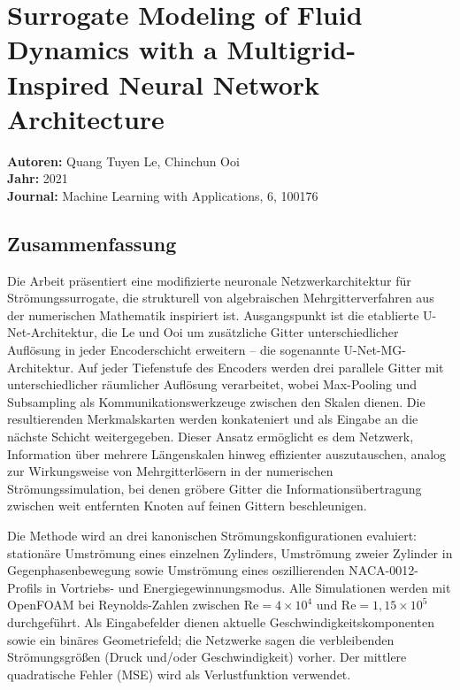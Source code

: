 \documentclass[a4paper,12pt]{article}
\begin{document}
\section*{Surrogate Modeling of Fluid Dynamics with a Multigrid-Inspired Neural
Network Architecture}
\textbf{Autoren:} Quang Tuyen Le, Chinchun Ooi \\
\textbf{Jahr:} 2021 \\
\textbf{Journal:} Machine Learning with Applications, 6, 100176

\subsection*{Zusammenfassung}

Die Arbeit präsentiert eine modifizierte neuronale Netzwerkarchitektur für
Strömungssurrogate, die strukturell von algebraischen Mehrgitterverfahren aus der
numerischen Mathematik inspiriert ist. Ausgangspunkt ist die etablierte U-Net-Architektur,
die Le und Ooi um zusätzliche Gitter unterschiedlicher Auflösung in jeder Encoderschicht
erweitern -- die sogenannte U-Net-MG-Architektur. Auf jeder Tiefenstufe des Encoders
werden drei parallele Gitter mit unterschiedlicher räumlicher Auflösung verarbeitet, wobei
Max-Pooling und Subsampling als Kommunikationswerkzeuge zwischen den Skalen dienen.
Die resultierenden Merkmalskarten werden konkateniert und als Eingabe an die nächste
Schicht weitergegeben. Dieser Ansatz ermöglicht es dem Netzwerk, Information über
mehrere Längenskalen hinweg effizienter auszutauschen, analog zur Wirkungsweise von
Mehrgitterlösern in der numerischen Strömungssimulation, bei denen gröbere Gitter die
Informationsübertragung zwischen weit entfernten Knoten auf feinen Gittern
beschleunigen.

Die Methode wird an drei kanonischen Strömungskonfigurationen evaluiert: stationäre
Umströmung eines einzelnen Zylinders, Umströmung zweier Zylinder in Gegenphasenbewegung sowie Umströmung eines oszillierenden NACA-0012-Profils in Vortriebs- und
Energiegewinnungsmodus. Alle Simulationen werden mit OpenFOAM bei Reynolds-Zahlen
zwischen $\mathrm{Re} = 4\times10^4$ und $\mathrm{Re} = 1{,}15\times10^5$ durchgeführt.
Als Eingabefelder dienen aktuelle Geschwindigkeitskomponenten sowie ein binäres
Geometriefeld; die Netzwerke sagen die verbleibenden Strömungsgrößen (Druck und/oder
Geschwindigkeit) vorher. Der mittlere quadratische Fehler (MSE) wird als Verlustfunktion
verwendet.
\end{document}
